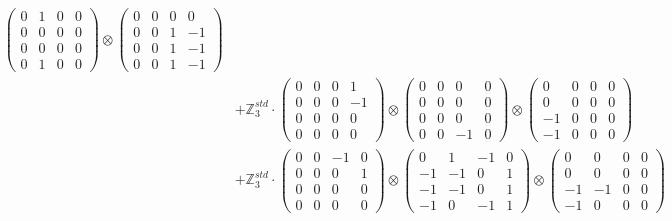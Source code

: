 \documentclass{article}
\begin{document}
{\begin{align}
            \begin{pmatrix} 0 & 1 & 0 & 0 \\ 0 & 0 & 0 & 0 \\ 0 & 0 & 0 & 0 \\ 0 & 1 & 0 & 0 \end{pmatrix} \otimes 
            \begin{pmatrix} 0 & 0 & 0 & 0 \\ 0 & 0 & 1 & -1 \\ 0 & 0 & 1 & -1 \\ 0 & 0 & 1 & -1 \end{pmatrix} \\ 
        &+ \label{Rs16-Rc11-Solution-19-c20} \mathbb{Z}_3^{std} \cdot 
            \begin{pmatrix} 0 & 0 & 0 & 1 \\ 0 & 0 & 0 & -1 \\ 0 & 0 & 0 & 0 \\ 0 & 0 & 0 & 0 \end{pmatrix} \otimes 
            \begin{pmatrix} 0 & 0 & 0 & 0 \\ 0 & 0 & 0 & 0 \\ 0 & 0 & 0 & 0 \\ 0 & 0 & -1 & 0 \end{pmatrix} \otimes 
            \begin{pmatrix} 0 & 0 & 0 & 0 \\ 0 & 0 & 0 & 0 \\ -1 & 0 & 0 & 0 \\ -1 & 0 & 0 & 0 \end{pmatrix} \\ 
        &+ \label{Rs16-Rc11-Solution-19-c21} \mathbb{Z}_3^{std} \cdot 
            \begin{pmatrix} 0 & 0 & -1 & 0 \\ 0 & 0 & 0 & 1 \\ 0 & 0 & 0 & 0 \\ 0 & 0 & 0 & 0 \end{pmatrix} \otimes 
            \begin{pmatrix} 0 & 1 & -1 & 0 \\ -1 & -1 & 0 & 1 \\ -1 & -1 & 0 & 1 \\ -1 & 0 & -1 & 1 \end{pmatrix} \otimes 
            \begin{pmatrix} 0 & 0 & 0 & 0 \\ 0 & 0 & 0 & 0 \\ -1 & -1 & 0 & 0 \\ -1 & 0 & 0 & 0 \end{pmatrix} \\ 

\end{align}}
\end{document}
